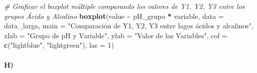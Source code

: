 \documentclass[
]{article}
\newenvironment{Shaded}{\begin{snugshade}}{\end{snugshade}}
\newcommand{\AttributeTok}[1]{\textcolor[rgb]{0.13,0.29,0.53}{#1}}
\newcommand{\CommentTok}[1]{\textcolor[rgb]{0.56,0.35,0.01}{\textit{#1}}}
\newcommand{\DecValTok}[1]{\textcolor[rgb]{0.00,0.00,0.81}{#1}}
\newcommand{\FunctionTok}[1]{\textcolor[rgb]{0.13,0.29,0.53}{\textbf{#1}}}
\newcommand{\NormalTok}[1]{#1}
\newcommand{\SpecialCharTok}[1]{\textcolor[rgb]{0.81,0.36,0.00}{\textbf{#1}}}
\newcommand{\StringTok}[1]{\textcolor[rgb]{0.31,0.60,0.02}{#1}}
\begin{document}
\begin{Shaded}
\begin{Highlighting}[]
\CommentTok{\# Graficar el boxplot múltiple comparando los valores de Y1, Y2, Y3 entre los grupos Ácido y Alcalino}
\FunctionTok{boxplot}\NormalTok{(value }\SpecialCharTok{\textasciitilde{}}\NormalTok{ pH\_grupo }\SpecialCharTok{*}\NormalTok{ variable, }
        \AttributeTok{data =}\NormalTok{ data\_larga,}
        \AttributeTok{main =} \StringTok{"Comparación de Y1, Y2, Y3 entre lagos ácidos y alcalinos"}\NormalTok{,}
        \AttributeTok{xlab =} \StringTok{"Grupo de pH y Variable"}\NormalTok{, }
        \AttributeTok{ylab =} \StringTok{"Valor de las Variables"}\NormalTok{,}
        \AttributeTok{col =} \FunctionTok{c}\NormalTok{(}\StringTok{"lightblue"}\NormalTok{, }\StringTok{"lightgreen"}\NormalTok{), }
        \AttributeTok{las =} \DecValTok{1}\NormalTok{)}
\end{Highlighting}
\end{Shaded}

\hypertarget{h-2}{%
\paragraph{H)}\label{h-2}}
\end{document}
